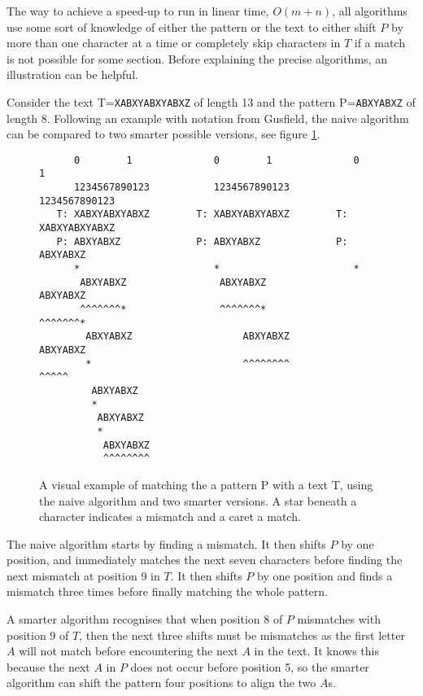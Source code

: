 The way to achieve a speed-up to run in linear time, $O(m+n)$, all algorithms use some sort of knowledge of either the pattern or the text to either shift $P$ by more than one character at a time or completely skip characters in $T$ if a match is not possible for some section. Before explaining the precise algorithms, an illustration can be helpful. 

Consider the text T=\verb|XABXYABXYABXZ| of length 13 and the pattern P=\verb|ABXYABXZ| of length 8. Following an example with notation from Gusfield\cite{Gusfield1997AlgorithmsOS}, the naive algorithm can be compared to two smarter possible versions, see figure \ref{fig:stringmatchingexample}. 

\begin{figure}[b!]
\begin{verbatim}
      0        1              0        1              0        1   
      1234567890123           1234567890123           1234567890123
   T: XABXYABXYABXZ        T: XABXYABXYABXZ        T: XABXYABXYABXZ
   P: ABXYABXZ             P: ABXYABXZ             P: ABXYABXZ     
      *                       *                       *            
       ABXYABXZ                ABXYABXZ                ABXYABXZ    
       ^^^^^^^*                ^^^^^^^*                ^^^^^^^*    
        ABXYABXZ                   ABXYABXZ                ABXYABXZ
        *                          ^^^^^^^^                   ^^^^^
         ABXYABXZ                                                  
         *                                                         
          ABXYABXZ                                                 
          *                                                        
           ABXYABXZ                                                
           ^^^^^^^^                                                
\end{verbatim}
    \caption{A visual example of matching the a pattern P with a text T, using the naive algorithm and two smarter versions. A star beneath a character indicates a mismatch and a caret a match. }
    \label{fig:stringmatchingexample}
\end{figure}

The naive algorithm starts by finding a mismatch. It then shifts $P$ by one position, and immediately matches the next seven characters before finding the next mismatch at position 9 in $T$. It then shifts $P$ by one position and finds a mismatch three times before finally matching the whole pattern. 

A smarter algorithm recognises that when position 8 of $P$ mismatches with position 9 of $T$, then the next three shifts must be mismatches as the first letter $A$ will not match before encountering the next $A$ in the text. It knows this because the next $A$ in $P$ does not occur before position 5, so the smarter algorithm can shift the pattern four positions to align the two $A$s. 

